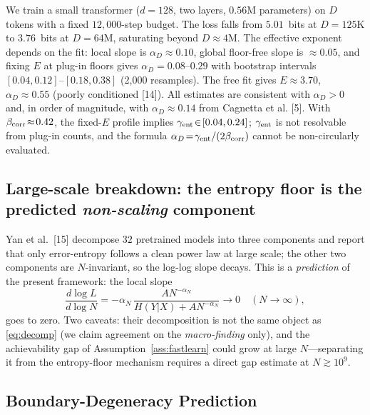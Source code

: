 \documentclass[entropy,article,submit,moreauthors,pdftex]{Definitions/mdpi}
\begin{document}
We train a small transformer ($d=128$, two layers, $0.56$M parameters) on $D$
tokens with a fixed $12{,}000$-step budget. The loss falls from $5.01$~bits at
$D=125$K to $3.76$~bits at $D=64$M, saturating beyond $D\!\approx\!4$M. The
effective exponent depends on the fit: local slope is
$\alpha_D\!\approx\!0.10$, global floor-free slope is $\approx\!0.05$, and
fixing $E$ at plug-in floors gives $\alpha_D\!=\!0.08$--$0.29$ with bootstrap
intervals $[0.04,0.12]$--$[0.18,0.38]$ (2{,}000 resamples). The free fit gives
$E\!\approx\!3.70$, $\alpha_D\!\approx\!0.55$ (poorly conditioned
[14]). All estimates are consistent with $\alpha_D>0$ and, in
order of magnitude, with $\alpha_D\!\approx\!0.14$ from Cagnetta et al. [5].
With $\beta_{\rm corr}\!\approx\!0.42$, the fixed-$E$ profile implies
$\gamma_{\rm ent}\!\in\![0.04,0.24]$; $\gamma_{\rm ent}$ is not resolvable
from plug-in counts, and the formula $\alpha_D\!=\!\gamma_{\rm ent}/(2\beta_{\rm corr})$ cannot be non-circularly evaluated.

\subsection{Large-scale breakdown: the entropy floor is the predicted
\emph{non-scaling} component}
\label{sec:yan}

Yan et al.~[15] decompose $32$ pretrained models into three
components and report that only error-entropy follows a clean power law at
large scale; the other two components are $N$-invariant, so the log-log slope
decays. This is a \emph{prediction} of the present framework: the local slope
\begin{equation}
\frac{d\log L}{d\log N}
  = -\alpha_N\,\frac{A N^{-\alpha_N}}{H(Y|X)+A N^{-\alpha_N}}
  \longrightarrow 0 \quad (N\to\infty),
  \label{eq:slope}
\end{equation}
goes to zero. Two caveats: their decomposition is not the same object as
\eqref{eq:decomp} (we claim agreement on the \emph{macro-finding} only), and
the achievability gap of Assumption~\ref{ass:fastlearn} could grow at large
$N$---separating it from the entropy-floor mechanism requires a direct gap
estimate at $N\gtrsim10^9$.

\subsection{Boundary-Degeneracy Prediction}
\label{sec:prediction}
\end{document}
